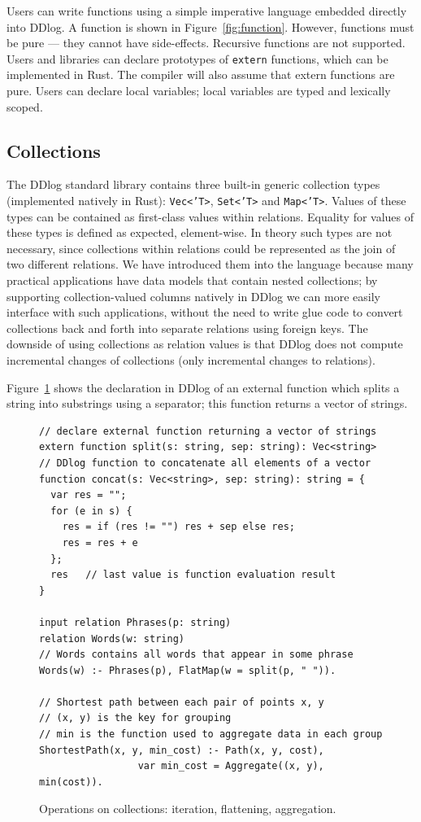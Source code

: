 Users can write functions using a simple imperative language embedded
directly into DDlog.  A function is shown in
Figure~\ref{fig:function}.  However, functions must be pure --- they
cannot have side-effects.  Recursive functions are not supported.
Users and libraries can declare prototypes of \texttt{extern}
functions, which can be implemented in Rust.  The compiler will also
assume that extern functions are pure.  Users can declare local
variables; local variables are typed and lexically scoped.

\subsection{Collections}

The DDlog standard library contains three built-in generic collection
types (implemented natively in Rust): \texttt{Vec<'T>},
\texttt{Set<'T>} and \texttt{Map<'T>}.  Values of these types can be
contained as first-class values within relations.  Equality for values
of these types is defined as expected, element-wise.  In theory such
types are not necessary, since collections within relations could be
represented as the join of two different relations.  We have
introduced them into the language because many practical applications
have data models that contain nested collections; by supporting
collection-valued columns natively in DDlog we can more easily
interface with such applications, without the need to write glue code
to convert collections back and forth into separate relations using
foreign keys.  The downside of using collections as relation values is
that DDlog does not compute incremental changes of collections (only
incremental changes to relations).

Figure~\ref{fig:collections} shows the declaration in DDlog of an
external function which splits a string into substrings using a
separator; this function returns a vector of strings.

\begin{figure}[t]
  \small
  \begin{lstlisting}[language=ddlog]
// declare external function returning a vector of strings
extern function split(s: string, sep: string): Vec<string>
// DDlog function to concatenate all elements of a vector
function concat(s: Vec<string>, sep: string): string = {
  var res = "";
  for (e in s) {
    res = if (res != "") res + sep else res;
    res = res + e
  };
  res   // last value is function evaluation result
}

input relation Phrases(p: string)
relation Words(w: string)
// Words contains all words that appear in some phrase
Words(w) :- Phrases(p), FlatMap(w = split(p, " ")).

// Shortest path between each pair of points x, y
// (x, y) is the key for grouping
// min is the function used to aggregate data in each group
ShortestPath(x, y, min_cost) :- Path(x, y, cost),
                 var min_cost = Aggregate((x, y), min(cost)).
\end{lstlisting}
\caption{Operations on collections: iteration, flattening,
  aggregation.\label{fig:collections}}
\end{figure}

